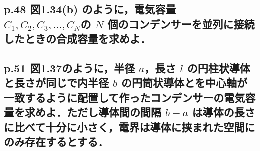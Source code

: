 \documentclass[a4paper, 12pt]{bxjsarticle}
\begin{document}
\subsection{p.48 図1.34(b) のように，電気容量 \(C_1,C_2,C_3,\ldots,C_N\)の \(N\) 個のコンデンサーを並列に接続したときの合成容量を求めよ．}

\newpage
\subsection{p.51 図1.37のように，半径 \(a\)，長さ \(l\) の円柱状導体と長さが同じで内半径 \(b\) の円筒状導体とを中心軸が一致するように配置して作ったコンデンサーの電気容量を求めよ．ただし導体間の間隔 \(b-a\) は導体の長さに比べて十分に小さく，電界は導体に挟まれた空間にのみ存在するとする．}
\end{document}
